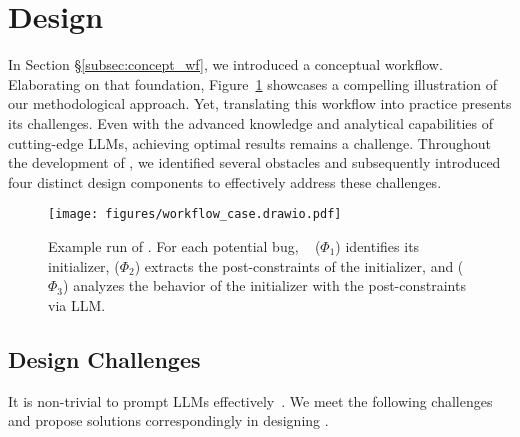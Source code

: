 \section{Design} 
\label{sec:design}



In Section \S\ref{subsec:concept_wf}, we introduced a conceptual workflow. Elaborating on that foundation, Figure~\ref{fig:wf-case} showcases a compelling illustration of our methodological approach. Yet, translating this workflow into practice presents its challenges. 
Even with the advanced knowledge and analytical capabilities of cutting-edge LLMs,
achieving optimal results remains a challenge. Throughout the development of \work, we identified several obstacles and subsequently introduced four distinct design components to effectively address these challenges.





\begin{figure}
    \hspace{-25pt}
    \texttt{[image: figures/workflow\_case.drawio.pdf]}
\caption{Example run of \work. For each potential bug, \work \   (\(\Phi_{1}\)) identifies its initializer, 
     (\(\Phi_{2}\)) extracts the post-constraints of the initializer, and
      (\(\Phi_{3}\)) analyzes the behavior of the initializer with the post-constraints via LLM. }
     \label{fig:wf-case}
\end{figure}







\subsection{Design Challenges}
\label{sec:design_chall}

It is non-trivial to prompt LLMs effectively~\cite{zhao2023survey, prompt_engineering}. We meet the following challenges and propose solutions correspondingly in designing \work.



